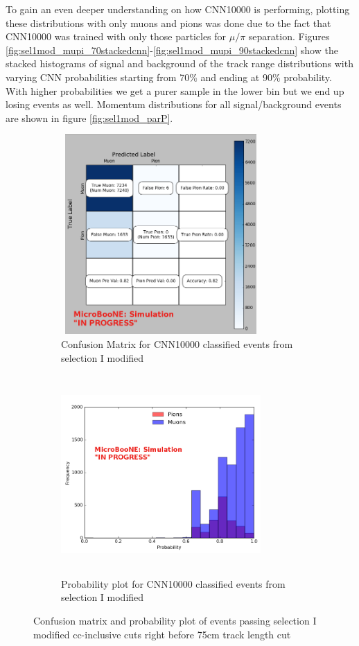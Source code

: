 To gain an even deeper understanding on how CNN10000 is performing, plotting these distributions with only muons and pions was done due to the fact that CNN10000 was trained with only those particles for $\mu/\pi$ separation. Figures \ref{fig:sel1mod_mupi_70stackedcnn}-\ref{fig:sel1mod_mupi_90stackedcnn} show the stacked histograms of signal and background of the track range distributions with varying CNN probabilities starting from 70\% and ending at 90\% probability. With higher probabilities we get a purer sample in the lower bin but we end up losing events as well. Momentum distributions for all signal/background events are shown in figure \ref{fig:sel1mod_parP}.    

\begin{figure}[htp!]
\centering
	\begin{subfigure}[b]{.45\textwidth}
	\includegraphics[width=3in,height=3in]{figs/sel1mod_confusion_wrongnorm.png}
	\caption{Confusion Matrix for CNN10000 classified events from selection I modified}
	\label{fig:confusion_sel1mod}
	\end{subfigure}
	\quad
	\begin{subfigure}[b]{.45\textwidth}
	\includegraphics[width=3in,height=3in]{figs/probplot_wrongnorm_selImod.png}
	\caption{Probability plot for CNN10000 classified events from selection I modified}  
	\label{fig:prob_sel1mod}
	\end{subfigure}
	\quad
\caption{Confusion matrix and probability plot of events passing selection I modified cc-inclusive cuts right before 75cm track length cut}
\label{probplots}
\end{figure}

